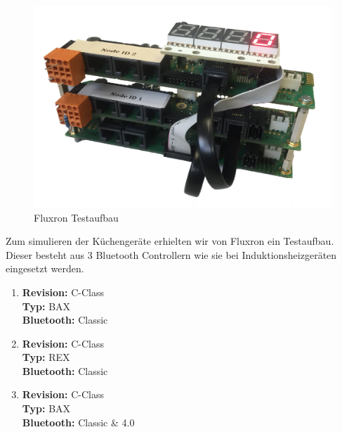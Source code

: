 \begin{figure}
	\includegraphics[scale=0.1025]{appendix/res/fluxron_device_transparent}
	\caption{Fluxron Testaufbau}
\end{figure}

Zum simulieren der Küchengeräte erhielten wir von Fluxron ein Testaufbau. Dieser besteht aus 3 Bluetooth Controllern wie sie bei Induktionsheizgeräten eingesetzt werden.

\begin{enumerate}[leftmargin=9.7cm]
\item \textbf{Revision:} C-Class\\ \textbf{Typ:} BAX\\ \textbf{Bluetooth:} Classic
\item \textbf{Revision:} C-Class\\ \textbf{Typ:} REX\\ \textbf{Bluetooth:} Classic
\item \textbf{Revision:} C-Class\\ \textbf{Typ:} BAX\\ \textbf{Bluetooth:} Classic \& 4.0
\end{enumerate}
